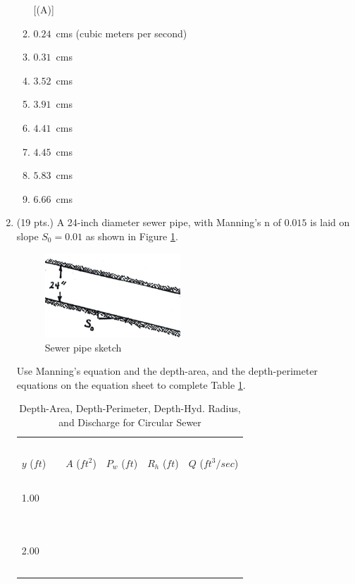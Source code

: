 \documentclass[11pt]{article}
\begin{document}
\begin{enumerate}
\begin{enumerate} [(A)]
\item $0.24$~cms (cubic meters per second)
\item $0.31$~cms 
\item $3.52$~cms 
\item $3.91$~cms 
\item $4.41$~cms 
\item $4.45$~cms 
\item $5.83$~cms 
\item $6.66$~cms 
\end{enumerate}

\clearpage
\item (19 pts.)
A 24-inch diameter sewer pipe, with Manning's n of $0.015$ is laid on slope $S_0 =0.01$ as shown in Figure \ref{fig:PipeOnSlope}.    

\begin{figure}[h!] %
\centering
   \includegraphics[width=2in]{PipeOnSlope.jpg}
   \caption{Sewer pipe sketch}
   \label{fig:PipeOnSlope} 
\end{figure}

Use Manning's equation and the depth-area, and the depth-perimeter equations on the equation sheet to complete Table \ref{tab:SewerPipes}.
\begin{table}[htbp]
   \centering
   \caption{Depth-Area, Depth-Perimeter, Depth-Hyd. Radius, and Discharge for Circular Sewer}
   \begin{tabular}{p{1in}p{1in}p{1in}p{1in}p{1in}}
   ~ & ~ & ~  & ~ & ~ \\
$y$ ($ft$)~~& $A$ ($ft^2$) & $P_w$ ($ft$) & $R_h$ ($ft$) & $Q$ ($ft^3/sec$) \\
\hline
\hline
~ & ~ & ~  & ~ & ~ \\
1.00 & ~ & ~  & ~ & ~ \\
~& ~ & ~  & ~ & ~ \\
\hline
~ & ~ & ~  & ~ & ~ \\
2.00 & ~ & ~  & ~ & ~ \\
~ & ~ & ~  & ~ & ~ \\
\hline
   \end{tabular}
   \label{tab:SewerPipes}
\end{table}


\end{enumerate}
\end{document}
